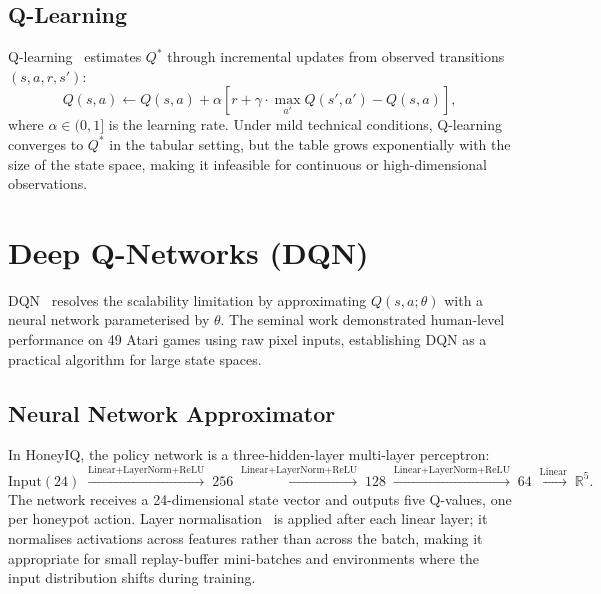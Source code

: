 \subsection{Q-Learning}

Q-learning~\citep{watkins1992q} estimates $Q^*$ through incremental updates
from observed transitions $(s, a, r, s')$:
%
\begin{equation}
  Q(s, a) \leftarrow Q(s, a) + \alpha\!\left[
      r + \gamma \cdot \max_{a'} Q(s', a') - Q(s, a)
  \right],
\end{equation}
%
where $\alpha \in (0, 1]$ is the learning rate.
Under mild technical conditions, Q-learning converges to $Q^*$ in the tabular
setting, but the table grows exponentially with the size of the state space,
making it infeasible for continuous or high-dimensional observations.

\section{Deep Q-Networks (DQN)}
\label{sec:bg_dqn}

DQN~\citep{mnih2015humanlevel} resolves the scalability limitation by
approximating $Q(s, a; \theta)$ with a neural network parameterised by
$\theta$.
The seminal work demonstrated human-level performance on 49 Atari games using
raw pixel inputs, establishing DQN as a practical algorithm for large state
spaces.

\subsection{Neural Network Approximator}

In HoneyIQ, the policy network is a three-hidden-layer multi-layer perceptron:
%
\begin{equation}
  \text{Input}(24)
  \;\xrightarrow{\text{Linear+LayerNorm+ReLU}}\; 256
  \;\xrightarrow{\text{Linear+LayerNorm+ReLU}}\; 128
  \;\xrightarrow{\text{Linear+LayerNorm+ReLU}}\; 64
  \;\xrightarrow{\text{Linear}}\; \mathbb{R}^5.
\end{equation}
%
The network receives a 24-dimensional state vector and outputs five Q-values,
one per honeypot action.
Layer normalisation~\citep{ba2016layer} is applied after each linear layer;
it normalises activations across features rather than across the batch,
making it appropriate for small replay-buffer mini-batches and environments
where the input distribution shifts during training.

